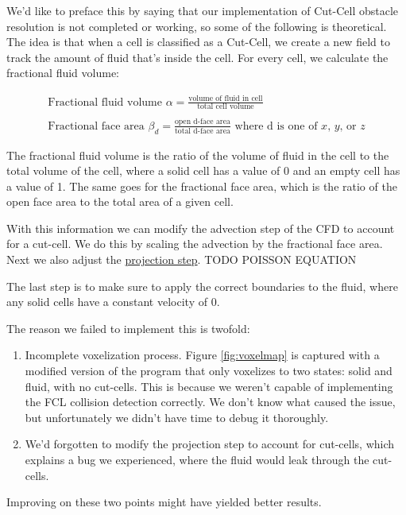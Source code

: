 \documentclass[a4paper,12pt,titlepage]{article}
\begin{document}
We'd like to preface this by saying that our implementation of Cut-Cell obstacle
resolution is not completed or working, so some of the following is theoretical.
The idea is that when a cell is classified as a Cut-Cell, we create a new field to
track the amount of fluid that's inside the cell. For every cell, we calculate the
fractional fluid volume:

\[
	\begin{array}{ll}
		\text{Fractional fluid volume } \alpha = \frac{\text{volume of fluid in cell}}{\text{total cell volume}} \\
		\\
		\text{Fractional face area } \beta_d = \frac{\text{open d-face area}}{\text{total d-face area}} \text{ where d is one of $x$, $y$, or $z$}
	\end{array}
\]

The fractional fluid volume is the ratio of the volume of fluid in the cell to the
total volume of the cell, where a solid cell has a value of 0 and an empty cell has
a value of 1. The same goes for the fractional face area, which is the ratio of the
open face area to the total area of a given cell.

With this information we can modify the advection step of the CFD to account for
a cut-cell. We do this by scaling the advection by the fractional face area. Next
we also adjust the \hyperref[projectionstep]{projection step}. TODO POISSON EQUATION

The last step is to make sure to apply the correct boundaries to the fluid,
where any solid cells have a constant velocity of 0.

The reason we failed to implement this is twofold:
\begin{enumerate}
	\item{
			Incomplete voxelization process. Figure \ref{fig:voxelmap} is
			captured with a modified version of the program that only voxelizes
			to two states: solid and fluid, with no cut-cells. This is because we
			weren't capable of implementing the FCL collision detection correctly.
			We don't know what caused the issue, but unfortunately we didn't have
			time to debug it thoroughly.
		}
	\item{
			We'd forgotten to modify the projection step to account for cut-cells,
			which explains a bug we experienced, where the fluid would leak through
			the cut-cells.
		}
\end{enumerate}

Improving on these two points might have yielded better results.
\end{document}
